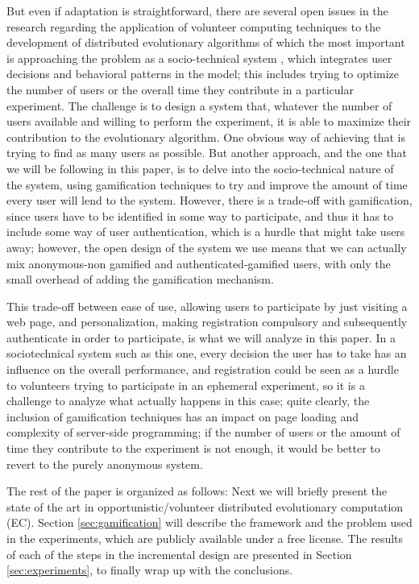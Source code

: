 \documentclass{llncs}
\begin{document}
But even if adaptation is straightforward, there are several open issues in the research regarding the
application of volunteer computing techniques to the development of
distributed evolutionary algorithms of which the most important is
approaching the problem as a socio-technical system
\cite{vespignani2009predicting,merelo2015designing}, which integrates
user decisions and behavioral patterns in the model; this
includes trying to optimize the number of users or the overall time
they contribute in a particular
experiment. The challenge is to design a system that, whatever the
number of users available and willing to perform the experiment, it is able to
maximize their contribution to the evolutionary algorithm. One obvious
way of achieving that is trying to find as many users as possible. But
another approach, and the one that we will be following in this paper, is
to delve into the socio-technical nature of the system, using
gamification techniques to try and improve the amount of time every user will
lend to the system. However, there is a trade-off with gamification,
since users have to be identified in some way to participate, and thus
it has to include some way of user authentication,
which is a hurdle that might take users away; however, the open design
of the system we use means that we can actually mix anonymous-non
gamified and authenticated-gamified users, with only the small overhead
of adding the gamification mechanism.

This trade-off between ease of use, allowing users to
participate by just visiting a web page, and personalization, making
registration compulsory and subsequently authenticate in order to
participate, is what we will analyze in this paper. In a sociotechnical system such as this one, every
decision the user has to take has an influence on the overall
performance, and registration could be seen as a hurdle to volunteers
trying to participate in an ephemeral experiment, so it is a challenge
to analyze what actually happens in this case; quite clearly, the
inclusion of gamification techniques has an impact on page loading and
complexity of server-side programming; if the number of users
or the amount of time they contribute to the experiment is not enough,
it would be better to revert to the purely anonymous system.

The rest of the paper is organized as follows: Next we will briefly
present the state of the art in opportunistic/volunteer distributed evolutionary
computation (EC). Section \ref{sec:gamification} will describe the
framework and the problem used in the experiments, which are publicly
available under a free license. The results of each of the steps in the incremental design are presented in Section
\ref{sec:experiments}, to finally wrap up with the conclusions.
\end{document}
